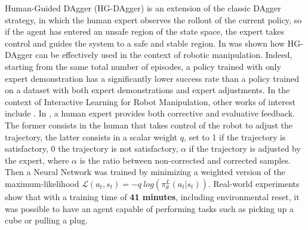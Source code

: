 \newline Human-Guided DAgger (HG-DAgger) \cite{kelly2019hg_dagger} is an extension of the classic DAgger strategy, in which the human expert observes the rollout of the current policy, so if the agent has entered an unsafe region of the state space, the expert takes control and guides the system to a safe and stable region. In \cite{jang2022bc_z} was shown how HG-DAgger can be effectively used in the context of robotic manipulation. Indeed, starting from the same total number of episodes, a policy trained with only expert demonstration has a significantly lower success rate than a policy trained on a dataset with both expert demonstrations and expert adjustments. In the context of Interactive Learning for Robot Manipulation, other works of interest include \cite{mandlekar2020human_in_the_loop,chisari2022correct}. In \cite{chisari2022correct}, a human expert provides both corrective and evaluative feedback. %
The former consists in the human that takes control of the robot to adjust the trajectory, the latter consists in a scalar weight $q$, set to 1 if the trajectory is satisfactory, 0 the trajectory is not satisfactory, $\alpha$ if the trajectory is adjusted by the expert, where $\alpha$ is the ratio between non-corrected and corrected samples. Then a Neural Network %
was trained by minimizing a weighted version of the maximum-likelihood $\mathcal{L}(a_{t},s_{t}) = - q \ log(\pi^{L}_{\theta}(a_{t}|s_{t}))$. Real-world experiments show that with a training time of \textbf{41 minutes}, including environmental reset, it was possible to have an agent capable of performing tasks such as picking up a cube or pulling a plug.
%

